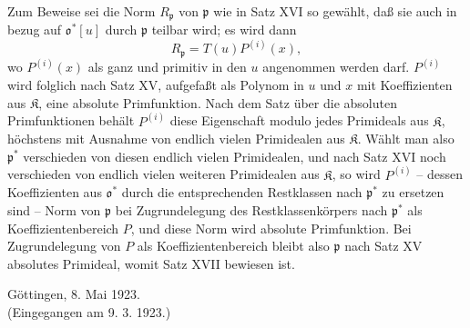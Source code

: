 \documentclass[11pt]{article}
\providecommand{\frakp}{\mathfrak p}
\begin{document}
Zum Beweise sei die Norm $R_\frakp$ von $\frakp$ wie in Satz XVI so gewählt, daß sie auch in bezug auf $\mathfrak o^*[u]$ durch $\frakp$ teilbar wird; es wird dann
\[
 R_\frakp=T(u)P^{(i)}(x),
\]
wo $P^{(i)}(x)$ als ganz und primitiv in den $u$ angenommen werden darf. $P^{(i)}$ wird folglich nach Satz XV, aufgefaßt als Polynom in $u$ und $x$ mit Koeffizienten aus $\mathfrak K$, eine absolute Primfunktion. Nach dem Satz über die absoluten Primfunktionen behält $P^{(i)}$ diese Eigenschaft modulo jedes Primideals aus $\mathfrak K$, höchstens mit Ausnahme von endlich vielen Primidealen aus $\mathfrak K$. Wählt man also $\frakp^*$ verschieden von diesen endlich vielen Primidealen, und nach Satz XVI noch verschieden von endlich vielen weiteren Primidealen aus $\mathfrak K$, so wird $P^{(i)}$ -- dessen Koeffizienten aus $\mathfrak o^*$ durch die entsprechenden Restklassen nach $\frakp^*$ zu ersetzen sind -- Norm von $\frakp$ bei Zugrundelegung des Restklassenkörpers nach $\frakp^*$ als Koeffizientenbereich $P$, und diese Norm wird absolute Primfunktion. Bei Zugrundelegung von $P$ als Koeffizientenbereich bleibt also $\frakp$ nach Satz XV absolutes Primideal, womit Satz XVII bewiesen ist.

\begin{center}
Göttingen, 8. Mai 1923.\\[1em]
(Eingegangen am 9. 3. 1923.)
\end{center}
\end{document}
